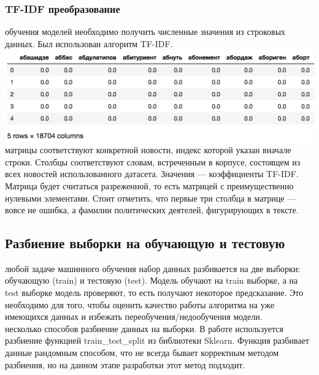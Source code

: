 \documentclass{article}
\newcommand\tab[1][1cm]{\hspace*{#1}}
\begin{document}
\subsubsection{TF-IDF преобразование}
 обучения моделей необходимо получить численные значения из строковых данных. Был использован алгоритм TF-IDF.\\
\includegraphics[scale=0.8]{f11.png}\\
 матрицы соответствуют конкретной новости, индекс которой указан вначале строки. Столбцы соответствуют словам, встреченным в корпусе, состоящем из всех новостей использованного датасета. Значения — коэффициенты TF-IDF. Матрица будет считаться разреженной, то есть матрицей с преимущественно нулевыми элементами. Стоит отметить, что первые три столбца в матрице — вовсе не ошибка, а фамилии политических деятелей, фигурирующих в тексте.
\subsection{Разбиение выборки на обучающую и тестовую}
 любой задаче машинного обучения набор данных разбивается на две выборки: обучающую (train) и тестовую (test). Модель обучают на train выборке, а на test выборке модель проверяют, то есть получают некоторое предсказание. Это необходимо для того, чтобы оценить качество работы алгоритма на уже имеющихся данных и избежать переобучения/недообучения модели. \\
 несколько способов разбиение данных на выборки. В работе используется разбиение функцией train\_test\_split из библиотеки Sklearn. Функция разбивает данные рандомным способом, что не всегда бывает корректным методом разбиения, но на данном этапе разработки этот метод подходит.\\
\end{document}
